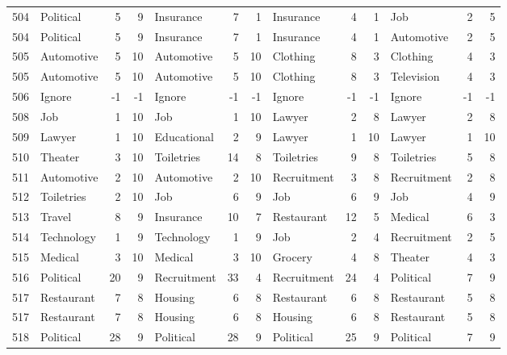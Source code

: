\begin{figure}[htbp]
\begin{tabular}{rlrrlrrlrrlrr}
    504   & Political & 5     & 9     & Insurance & 7     & 1     & Insurance & 4     & 1     & Job   & 2     & 5 \\
    504   & Political & 5     & 9     & Insurance & 7     & 1     & Insurance & 4     & 1     & Automotive & 2     & 5 \\
    505   & Automotive & 5     & 10    & Automotive & 5     & 10    & Clothing & 8     & 3     & Clothing & 4     & 3 \\
    505   & Automotive & 5     & 10    & Automotive & 5     & 10    & Clothing & 8     & 3     & Television & 4     & 3 \\
    506   & Ignore & -1    & -1    & Ignore & -1    & -1    & Ignore & -1    & -1    & Ignore & -1    & -1 \\
    508   & Job   & 1     & 10    & Job   & 1     & 10    & Lawyer & 2     & 8     & Lawyer & 2     & 8 \\
    509   & Lawyer & 1     & 10    & Educational & 2     & 9     & Lawyer & 1     & 10    & Lawyer & 1     & 10 \\
    510   & Theater & 3     & 10    & Toiletries & 14    & 8     & Toiletries & 9     & 8     & Toiletries & 5     & 8 \\
    511   & Automotive & 2     & 10    & Automotive & 2     & 10    & Recruitment & 3     & 8     & Recruitment & 2     & 8 \\
    512   & Toiletries & 2     & 10    & Job   & 6     & 9     & Job   & 6     & 9     & Job   & 4     & 9 \\
    513   & Travel & 8     & 9     & Insurance & 10    & 7     & Restaurant & 12    & 5     & Medical & 6     & 3 \\
    514   & Technology & 1     & 9     & Technology & 1     & 9     & Job   & 2     & 4     & Recruitment & 2     & 5 \\
    515   & Medical & 3     & 10    & Medical & 3     & 10    & Grocery & 4     & 8     & Theater & 4     & 3 \\
    516   & Political & 20    & 9     & Recruitment & 33    & 4     & Recruitment & 24    & 4     & Political & 7     & 9 \\
    517   & Restaurant & 7     & 8     & Housing & 6     & 8     & Restaurant & 6     & 8     & Restaurant & 5     & 8 \\
    517   & Restaurant & 7     & 8     & Housing & 6     & 8     & Housing & 6     & 8     & Restaurant & 5     & 8 \\
    518   & Political & 28    & 9     & Political & 28    & 9     & Political & 25    & 9     & Political & 7     & 9 \\

\end{tabular}
\end{figure}
